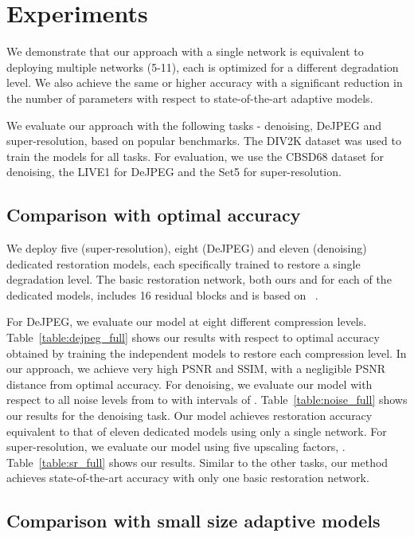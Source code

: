 \documentclass{article}
\begin{document}
\section{Experiments} 

We demonstrate that our approach with a single network is equivalent to deploying multiple networks (5-11), each is optimized for a different degradation level. We also achieve the same or higher accuracy with a significant reduction in the number of parameters with respect to state-of-the-art adaptive models.


We evaluate our approach with the following tasks - denoising, DeJPEG and super-resolution, based on popular benchmarks. The DIV2K\cite{Agustsson_2017_CVPR_Workshops} dataset was used to train the models for all tasks. For evaluation, we use the CBSD68 dataset \cite{martin2001database} for denoising, the LIVE1 \cite{LIVE1} for DeJPEG and the Set5 \cite{set5} for super-resolution. 


\subsection{Comparison with optimal accuracy}

We deploy five (super-resolution), eight (DeJPEG) and eleven (denoising) dedicated restoration models, each specifically trained to restore a single degradation level. The basic restoration network, both ours and for each of the dedicated models, includes 16 residual blocks and is based on ~\cite{arcnn}. 

For DeJPEG, we evaluate our model at eight different compression levels. Table~\ref{table:dejpeg_full} shows our results with respect to optimal accuracy obtained by training the independent models to restore each compression level. In our approach, we achieve very high PSNR and SSIM, with a negligible PSNR distance from optimal accuracy. For denoising, we evaluate our model with respect to all noise levels from  to  with intervals of . Table~\ref{table:noise_full} shows our results for the denoising task. Our model achieves restoration accuracy equivalent to that of eleven dedicated models using only a single network. For super-resolution, we evaluate our model using five upscaling factors, . Table~\ref{table:sr_full} shows our results. Similar to the other tasks, our method achieves state-of-the-art accuracy with only one basic restoration network. 


\subsection{Comparison with small size adaptive models}
\end{document}

